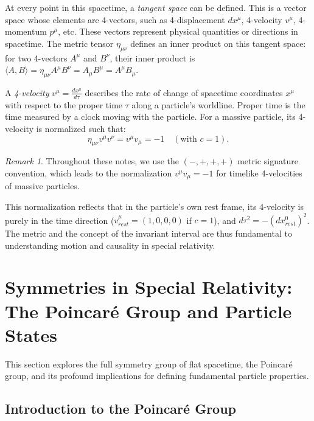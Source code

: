 \documentclass{amsart}
\theoremstyle{definition}
\theoremstyle{remark}
\newtheorem*{remark}{Remark}
\begin{document}
At every point in this spacetime, a \emph{tangent space} can be defined.
This is a vector space whose elements are 4-vectors, such as 4-displacement $dx^\mu$, 4-velocity $v^\mu$, 4-momentum $p^\mu$, etc.
These vectors represent physical quantities or directions in spacetime.
The metric tensor $\eta_{\mu\nu}$ defines an inner product on this tangent space: for two 4-vectors $A^\mu$ and $B^\nu$, their inner product is $\langle A, B \rangle = \eta_{\mu\nu} A^\mu B^\nu = A_\mu B^\mu = A^\mu B_\mu$.

A \emph{4-velocity} $v^\mu = \frac{dx^\mu}{d\tau}$ describes the rate of change of spacetime coordinates $x^\mu$ with respect to the proper time $\tau$ along a particle's worldline.
Proper time is the time measured by a clock moving with the particle.
For a massive particle, its 4-velocity is normalized such that:
\begin{equation*}
  \eta_{\mu\nu} v^\mu v^\nu = v^\mu v_\mu = -1 \quad (\text{with } c=1).
\end{equation*}
\begin{remark}
Throughout these notes, we use the $(-,+,+,+)$ metric signature convention, which leads to the normalization $v^\mu v_\mu = -1$ for timelike 4-velocities of massive particles.
\end{remark}
This normalization reflects that in the particle's own rest frame, its 4-velocity is purely in the time direction ($v^\mu_{rest} = (1,0,0,0)$ if $c=1$), and $d\tau^2 = -(dx^0_{rest})^2$.
The metric and the concept of the invariant interval are thus fundamental to understanding motion and causality in special relativity.

\section{Symmetries in Special Relativity: The Poincaré Group and Particle States}
\label{sec:poincare_particle_states}

This section explores the full symmetry group of flat spacetime, the Poincaré group, and its profound implications for defining fundamental particle properties.

\subsection{Introduction to the Poincaré Group}
\label{subsec:intro_poincare}
\end{document}

